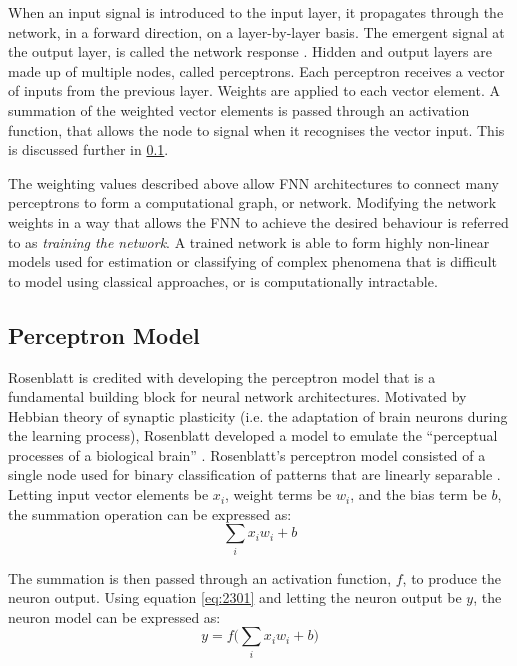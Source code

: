 When an input signal is introduced to the input layer, it propagates through the network, in a forward direction, on a layer-by-layer basis. The emergent signal at the output layer, is called the network response \cite{Haykin99}. Hidden and output layers are made up of multiple nodes, called perceptrons. Each perceptron receives a vector of inputs from the previous layer. Weights are applied to each vector element. A summation of the weighted vector elements is passed through an activation function, that allows the node to signal when it recognises the vector input. This is discussed further in \textsection \ref{sec:perceptron_model}.

The weighting values described above allow FNN architectures to connect many perceptrons to form a computational graph, or network. Modifying the network weights in a way that allows the FNN to achieve the desired behaviour is referred to as \textit{training the network}. A trained network is able to form highly non-linear models used for estimation or classifying of complex phenomena that is difficult to model using classical approaches, or is computationally intractable.



\subsection{Perceptron Model}\label{sec:perceptron_model}
Rosenblatt is credited with developing the perceptron model that is a fundamental building block for neural network architectures. Motivated by Hebbian theory of synaptic plasticity (i.e. the adaptation of brain neurons during the learning process), Rosenblatt developed a model to emulate the ``perceptual processes of a biological brain'' \cite{Rosenblatt1957}. Rosenblatt's perceptron model consisted of a single node used for binary classification of patterns that are linearly separable \cite{Rosenblatt1958}. %
Letting input vector elements be $x_i$, weight terms be $w_i$, and the bias term be $b$, the summation operation can be expressed as:
\begin{equation}
	\sum_{i}x_i w_i + b \label{eq:2301}
\end{equation} 

The summation is then passed through an activation function, $f$, to produce the neuron output. Using equation \ref{eq:2301} and letting the neuron output be $y$, the neuron model can be expressed as:
\begin{equation}
	y = f\bigg( \sum_{i}x_i w_i + b \bigg) \label{eq:2302}
\end{equation}

